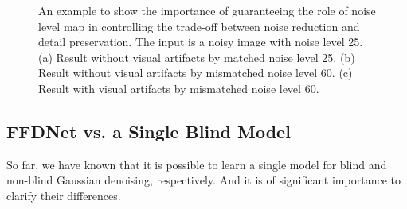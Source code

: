 \documentclass[journal]{IEEEtran}
\begin{document}
\begin{figure}[!tbp]%
\begin{center}
\caption{An example to show the importance of guaranteeing the role of noise level map in controlling the trade-off between noise reduction and detail preservation. The input is a noisy image with noise level 25. (a) Result without visual artifacts by matched noise level 25. (b) Result without visual artifacts by mismatched noise level 60. (c) Result with visual artifacts by mismatched noise level 60.}\label{fig_na1}
\end{center}%
\end{figure}


\subsection{{FFDNet vs. a Single Blind Model}}
So far, we have known that it is possible to learn a single model for blind and non-blind Gaussian denoising, respectively.
And it is of significant importance to clarify their differences.
\end{document}
